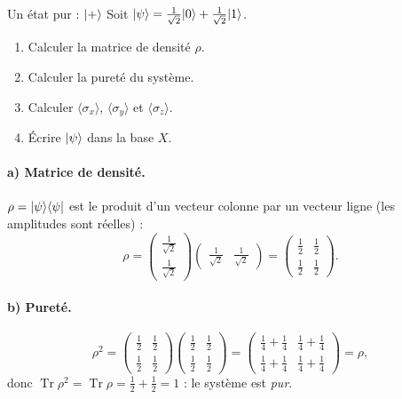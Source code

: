 \begin{exercice}{Un état pur : $|+\rangle$}\label{ex:purplus}
Soit $|\psi\rangle=\frac{1}{\sqrt2}|0\rangle+\frac{1}{\sqrt2}|1\rangle$.
\begin{enumerate}[label=\alph*),nosep]
  \item Calculer la matrice de densité $\rho$.
  \item Calculer la pureté du système.
  \item Calculer $\langle\sigma_x\rangle$, $\langle\sigma_y\rangle$ et $\langle\sigma_z\rangle$.
  \item Écrire $|\psi\rangle$ dans la base $X$.
\end{enumerate}
\end{exercice}
\begin{correction}
\paragraph{a) Matrice de densité.} $\rho=|\psi\rangle\langle \psi|$ est le produit d'un vecteur colonne
par un vecteur ligne (les amplitudes sont réelles) :
\[
  \rho=\begin{pmatrix}\frac{1}{\sqrt2}\\[0.4ex]\frac{1}{\sqrt2}\end{pmatrix}
       \begin{pmatrix}\frac{1}{\sqrt2}&\frac{1}{\sqrt2}\end{pmatrix}
  =\begin{pmatrix}\frac12&\frac12\\[0.4ex]\frac12&\frac12\end{pmatrix}.
\]

\paragraph{b) Pureté.}
\[
  \rho^2=\begin{pmatrix}\frac12&\frac12\\[0.4ex]\frac12&\frac12\end{pmatrix}
         \begin{pmatrix}\frac12&\frac12\\[0.4ex]\frac12&\frac12\end{pmatrix}
  =\begin{pmatrix}\frac14+\frac14&\frac14+\frac14\\[0.4ex]\frac14+\frac14&\frac14+\frac14\end{pmatrix}
  =\rho,
\]
donc $\operatorname{Tr}\rho^2=\operatorname{Tr}\rho=\frac12+\frac12=1$ : le système est \emph{pur}.


\end{correction}
